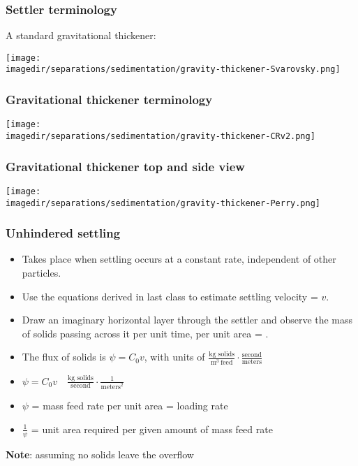 \begin{frame}\frametitle{Settler terminology}
	A standard gravitational thickener:
	
	\begin{center}
		\texttt{[image: \\imagedir/separations/sedimentation/gravity-thickener-Svarovsky.png]}
	\end{center}
\end{frame}

\begin{frame}\frametitle{Gravitational thickener terminology}
	\begin{center}
		\texttt{[image: \\imagedir/separations/sedimentation/gravity-thickener-CRv2.png]}
	\end{center}
\end{frame}

\begin{frame}\frametitle{Gravitational thickener top and side view}
	\begin{center}
		\texttt{[image: \\imagedir/separations/sedimentation/gravity-thickener-Perry.png]}
	\end{center}
\end{frame}

\begin{frame}\frametitle{Unhindered settling}
	\begin{itemize}
		\item	Takes place when settling occurs at a constant rate, independent of other particles.
		\item	Use the equations derived in last class to estimate settling velocity = $v$.
		\item	Draw an imaginary horizontal layer through the settler and observe the mass of solids passing across it per unit time, per unit area = {\color{myOrange}{mass flux}}.
		\item	The flux of solids is $\psi = C_0 v$, with units of $\displaystyle \frac{\text{kg solids}}{\text{m}^3~\text{feed}} \cdot \frac{\text{second}}{\text{meters}}$
		\item	$ \psi = C_0 v \quad \displaystyle \frac{\text{kg solids}}{\text{second}} \cdot \frac{1}{\text{meters}^2}$
		\item	$\psi$ = mass feed rate per unit area = loading rate
		\item	$\displaystyle \frac{1}{\psi}$ = unit area required per given amount of mass feed rate
	\end{itemize}
	\textbf{Note}: assuming no solids leave the overflow
\end{frame}

